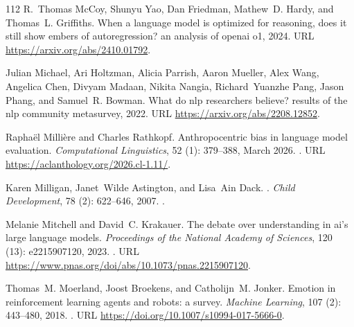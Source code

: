 \begin{thebibliography}{112}
R.~Thomas McCoy, Shunyu Yao, Dan Friedman, Mathew~D. Hardy, and Thomas~L. Griffiths.
\newblock When a language model is optimized for reasoning, does it still show embers of autoregression? an analysis of openai o1, 2024{}.
\newblock URL \url{https://arxiv.org/abs/2410.01792}.

Julian Michael, Ari Holtzman, Alicia Parrish, Aaron Mueller, Alex Wang, Angelica Chen, Divyam Madaan, Nikita Nangia, Richard~Yuanzhe Pang, Jason Phang, and Samuel~R. Bowman.
\newblock What do nlp researchers believe? results of the nlp community metasurvey, 2022.
\newblock URL \url{https://arxiv.org/abs/2208.12852}.

Rapha{\"e}l Milli{\`e}re and Charles Rathkopf.
\newblock Anthropocentric bias in language model evaluation.
\newblock \emph{Computational Linguistics}, 52 (1): 379--388, March 2026.
\newblock {}.
\newblock URL \url{https://aclanthology.org/2026.cl-1.11/}.

Karen Milligan, Janet~Wilde Astington, and Lisa~Ain Dack.
.
\newblock \emph{Child Development}, 78 (2): 622--646, 2007.
\newblock {}.

Melanie Mitchell and David~C. Krakauer.
\newblock The debate over understanding in ai’s large language models.
\newblock \emph{Proceedings of the National Academy of Sciences}, 120 (13): e2215907120, 2023.
\newblock {}.
\newblock URL \url{https://www.pnas.org/doi/abs/10.1073/pnas.2215907120}.

Thomas~M. Moerland, Joost Broekens, and Catholijn~M. Jonker.
\newblock Emotion in reinforcement learning agents and robots: a survey.
\newblock \emph{Machine Learning}, 107 (2): 443--480, 2018.
\newblock {}.
\newblock URL \url{https://doi.org/10.1007/s10994-017-5666-0}.


\end{thebibliography}
